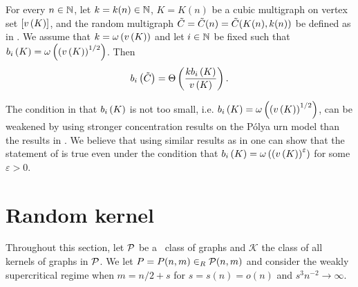 \begin{lem}\label{CBlem:block_core}
	For every $n \in \mathbb{N}$, let $k=k(n) \in \mathbb{N}$, $K=K(n)$ be a cubic multigraph on vertex set $[v\left({K}\right)]$, and the random multigraph $\tilde{C}=\tilde{C}(n)=\tilde{C}(K(n),k(n))$ be defined as in . We assume that $k=\omega\left(v\left({K}\right)\right)$ and let $i\in \mathbb{N}$ be fixed such that $b_{i}\left(K\right)=\omega\left(\left(v\left({K}\right)\right)^{1/2}\right)$. Then \whp
	\begin{align*}
	b_{i}\left(\tilde{C}\right)=\Theta\left(\frac{k b_{i}\left(K\right)}{v\left({K}\right)}\right).
	\end{align*}
\end{lem}

\begin{remark}\label{CBrem:improve}
	The condition in  that $b_{i}\left(K\right)$ is not too small, i.e. $b_{i}\left(K\right)=\omega\left(\left(v\left({K}\right)\right)^{1/2}\right)$, can be weakened by using stronger concentration results on the P\'olya urn model than the results in . We believe that using similar results as in  one can show that the statement of  is true even under the condition that $b_{i}\left(K\right)=\omega\left(\left(v\left({K}\right)\right)^\varepsilon\right)$ for some $\varepsilon>0$.
\end{remark}

\section{Random kernel}\label{CBsec:random_kernel}
Throughout this section, let $\mathcal{P}$ be a \pl\ class of graphs and $\mathcal{K}$ the class of all kernels of graphs in $\mathcal{P}$. 
We let $P=P(n,m)\in_R \mathcal{P}(n,m)$ and consider the weakly supercritical regime when $m=n/2+s$ for $s=s(n)=o(n)$ and $s^3n^{-2} \to \infty$. 

